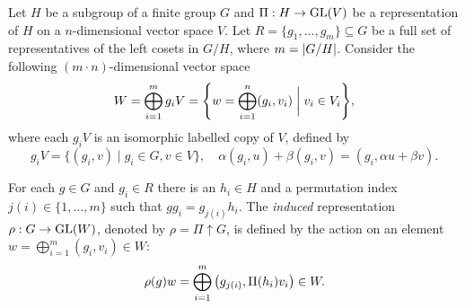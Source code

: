\begin{definition} \label{def:induction_defi}
Let $H$ be a subgroup of a finite group $G$ and $\Pi: H \to {\text{GL}}(V)$ be a representation of $H$ on a $n$-dimensional vector space $V$. Let $R = \{g_1, \ldots, g_m\} \subseteq G$ be a full set of representatives of the left cosets in $G/H$, where $m = \abs{G/H}$. Consider the following $(m\cdot n)$-dimensional vector space
\begin{equation} \label{eq:W_vectorspace_induction_copies}
W = \bigoplus_{i=1}^m g_i V = \qty{w = \bigoplus_{i=1}^n (g_i, v_i) \;\bigg|\; v_i \in V_i},
\end{equation}
where each $g_i V$ is an isomorphic labelled copy of $V$, defined by
\begin{equation} \label{eq:giV_vectorspace_labelled_copy}
g_i V = \{ (g_i, v) \mid g_i \in G, v \in V\}, \quad
\alpha (g_i, u) + \beta (g_i, v) = (g_i, \alpha u + \beta v).
\end{equation}

For each $g \in G$ and $g_i \in R$ there is an $h_i \in H$ and a permutation index $j(i) \in \{1, \ldots, m\}$ such that $g g_i = g_{j(i)} h_i$. The \textit{induced} representation $\rho: G \to {\text{GL}}(W)$, denoted by $\rho = \Pi \uparrow G$, is defined by the action on an element $w = \bigoplus_{i=1}^{m} (g_i, v_i) \in W$:
\begin{equation} \label{eq:induced_rep_action_defi}
\rho(g) w = \bigoplus_{i=1}^{m} \qty(g_{j(i)}, \Pi(h_i) v_i) \in W.
\end{equation}
\end{definition}

